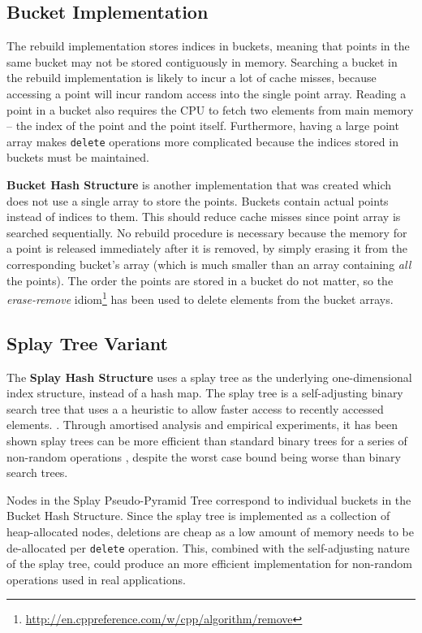 \subsection{Bucket Implementation}

The rebuild implementation stores indices in buckets, meaning that points in the same bucket may not be stored contiguously in memory. Searching a bucket in the rebuild implementation is likely to incur a lot of cache misses, because accessing a point will incur random access into the single point array. Reading a point in a bucket also requires the CPU to fetch two elements from main memory -- the index of the point and the point itself. Furthermore, having a large point array makes \texttt{delete} operations more complicated because the indices stored in buckets must be maintained.

\textbf{Bucket Hash Structure} is another implementation that was created which does not use a single array to store the points. Buckets contain actual points instead of indices to them. This should reduce cache misses since point array is searched sequentially. No rebuild procedure is necessary because the memory for a point is released immediately after it is removed, by simply erasing it from the corresponding bucket's array (which is much smaller than an array containing \textit{all} the points). The order the points are stored in a bucket do not matter, so the \textit{erase-remove} idiom\footnote{\url{http://en.cppreference.com/w/cpp/algorithm/remove}} has been used to delete elements from the bucket arrays.

\subsection{Splay Tree Variant}

The \textbf{Splay Hash Structure} uses a splay tree as the underlying one-dimensional index structure, instead of a hash map. The splay tree is a self-adjusting binary search tree that uses a a heuristic to allow faster access to recently accessed elements. \cite{splay-tree}. Through amortised analysis and empirical experiments, it has been shown splay trees can be more efficient than standard binary trees for a series of non-random operations \cite{splay-tree}, despite the worst case bound being worse than binary search trees.

Nodes in the Splay Pseudo-Pyramid Tree correspond to individual buckets in the Bucket Hash Structure. Since the splay tree is implemented as a collection of heap-allocated nodes, deletions are cheap as a low amount of memory needs to be de-allocated per \texttt{delete} operation. This, combined with the self-adjusting nature of the splay tree, could produce an more efficient  implementation for non-random operations used in real applications.

